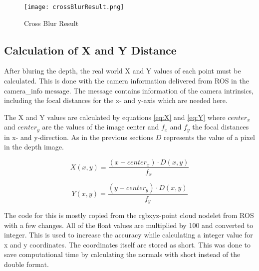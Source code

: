 \begin{figure}[H]
\begin{center}
  \texttt{[image: crossBlurResult.png]}
  \caption{Cross Blur Result}
  \label{figure:crossblurResult}
\end{center}
\end{figure} 


\subsection{Calculation of X and Y Distance}
After bluring the depth, the real world X and Y values of each point must be calculated. 
This is done with the camera information delivered from ROS in the camera\_info message.
The message contains information of the camera intrinsics, including the focal 
distances for the x- and y-axis which are needed here.

The X and Y values are calculated by equations \vref{eq:X} and \vref{eq:Y} where $center_x$ and $center_y$ are
the values of the image center and $f_x$ and $f_y$ the focal distances in x- and y-direction. As in the
previous sections $D$ represents the value of a pixel in the depth image.

\begin{equation}
X(x,y)=\frac{(x-center_x) \cdot D(x,y)}{f_x}
\label{eq:X}
\end{equation}

\begin{equation}
Y(x,y)=\frac{(y-center_y) \cdot D(x,y)}{f_y}
\label{eq:Y}
\end{equation}

The code for this is mostly copied from the rgbxyz-point cloud nodelet from ROS with a few changes.
All of the float values are multiplied by 100 and converted to integer. This is used to increase the accuracy while
calculating a integer value for x and y coordinates. The coordinates itself are stored as short. This was done to save
computational time by calculating the normals with short instead of the double format.

